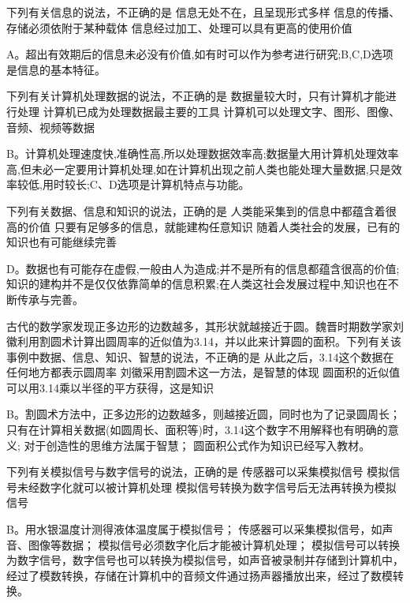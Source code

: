 \begin{groups}
\begin{questions}[rp]
\question
{}下列有关信息的说法，不正确的是
{信息无处不在，且呈现形式多样}
{信息的传播、存储必须依附于某种载体}
{信息经过加工、处理可以具有更高的使用价值}
\begin{solution}
A。超出有效期后的信息未必没有价值,如有时可以作为参考进行研究;B,C,D选项是信息的基本特征。
\end{solution}

\question
{}下列有关计算机处理数据的说法，不正确的是
{数据量较大时，只有计算机才能进行处理}
{计算机已成为处理数据最主要的工具}
{计算机可以处理文字、图形、图像、音频、视频等数据}
\begin{solution}
B。计算机处理速度快,准确性高,所以处理数据效率高;数据量大用计算机处理效率高,但未必一定要用计算机处理,如在计算机出现之前人类也能处理大量数据,只是效率较低,用时较长;C、D选项是计算机特点与功能。
\end{solution}

\question
{}下列有关数据、信息和知识的说法，正确的是
{人类能采集到的信息中都蕴含着很高的价值}
{只要有足够多的信息，就能建构任意知识}
{随着人类社会的发展，已有的知识也有可能继续完善}
\begin{solution}
D。数据也有可能存在虚假,一般由人为造成;并不是所有的信息都蕴含很高的价值;知识的建构并不是仅仅依靠简单的信息积累;在人类这社会发展过程中,知识也在不断传承与完善。
\end{solution}

\question
{}古代的数学家发现正多边形的边数越多，其形状就越接近于圆。魏晋时期数学家刘徽利用割圆术计算出圆周率的近似值为3.14，并以此来计算圆的面积。下列有关该事例中数据、信息、知识、智慧的说法，不正确的是
{从此之后，3.14这个数据在任何地方都表示圆周率}
{刘徽采用割圆术这一方法，是智慧的体现}
{圆面积的近似值可以用3.14乘以半径的平方获得，这是知识}
\begin{solution}
B。割圆术方法中，正多边形的边数越多，则越接近圆，同时也为了记录圆周长；
只有在计算相关数据(如圆周长、面积等)时，3.14这个数字不用解释也有明确的意义;
对于创造性的思维方法属于智慧；
圆面积公式作为知识已经写入教材。
\end{solution}

\question
{}下列有关模拟信号与数字信号的说法，正确的是
{传感器可以采集模拟信号}
{模拟信号未经数字化就可以被计算机处理}
{模拟信号转换为数字信号后无法再转换为模拟信号}
\begin{solution}
B。用水银温度计测得液体温度属于模拟信号；
传感器可以采集模拟信号，如声音、图像等数据；
模拟信号必须数字化后才能被计算机处理；
模拟信号可以转换为数字信号，数字信号也可以转换为模拟信号，如声音被录制并存储到计算机中，经过了模数转换，存储在计算机中的音频文件通过扬声器播放出来，经过了数模转换。
\end{solution}


\end{questions}
\end{groups}
